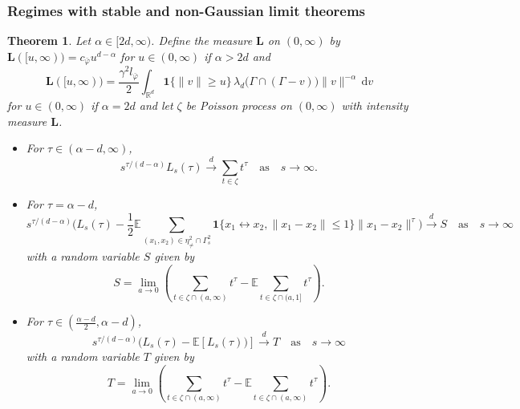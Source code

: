 \documentclass{article}
\newtheorem{theorem}{Theorem}[section]
\theoremstyle{definition}
\numberwithin{equation}{section}
\theoremstyle{remark}
\newcommand{\R}{\mathbb{R}}
\begin{document}








\subsubsection{Regimes with stable and non-Gaussian limit theorems}\label{nongaussianregime}

\begin{theorem}\label{thm:stable}
Let $\alpha\in[2d,\infty)$. Define the measure $\mathbf{L}$ on $(0,\infty)$ by $\mathbf{L}([u,\infty))=c_{\bar\varphi}u^{d-\alpha}$ for $u\in(0,\infty)$ if $\alpha>2d$ and
$$
\mathbf{L}([u,\infty))= \frac{\gamma^2l_{\bar{\varphi}}}{2} \int_{\R^d}
\mathbf{1}\Big\{\|v\|\geq u\Big\}\, 
\lambda_d\big(\Gamma\cap(\Gamma-v)\big) \|v\|^{-\alpha}\,\mathrm{d}v
$$
for $u\in(0,\infty)$ if $\alpha=2d$ and let $\zeta$ be Poisson process on $(0,\infty)$ with intensity measure $\mathbf{L}$.
\begin{itemize}
\item [a)] For $\tau\in (\alpha-d,\infty)$,
$$
s^{\tau/(d-\alpha)} L_s(\tau) \overset{d}{\longrightarrow} \sum_{t\in \zeta} t^\tau \quad \text{as} \quad s\to\infty.
$$
\item [b)] For $\tau=\alpha-d$,
$$
s^{\tau/(d-\alpha)} \bigg(L_s(\tau) - \frac{1}{2} \mathbb{E}\sum_{(x_1,x_2)\in\eta^2_{\neq} \cap \Gamma_s^2} \mathbf{1}\{x_1 \leftrightarrow x_2, \|x_1-x_2\|\leq 1\} \|x_1-x_2\|^\tau \bigg) \overset{d}{\longrightarrow} S \quad \text{as} \quad s\to\infty
$$
with a random variable $S$ given by
$$
S=\lim_{a\to0} \left(\sum_{t\in\zeta\cap(a,\infty)} t^\tau - \mathbb{E} \sum_{t\in\zeta\cap(a,1]} t^\tau\right). 
$$
\item [c)] For $\tau\in (\frac{\alpha-d}{2},\alpha-d)$,
$$
s^{\tau/(d-\alpha)} (L_s(\tau) - \mathbb{E}[L_s(\tau))] \overset{d}{\longrightarrow} T \quad \text{as} \quad s\to\infty
$$
with a random variable $T$ given by
$$
T=\lim_{a\to0} \left(\sum_{t\in\zeta\cap(a,\infty)} t^\tau - \mathbb{E} \sum_{t\in\zeta\cap(a,\infty)} t^\tau\right). 
$$
\end{itemize}
\end{theorem}
\end{document}
